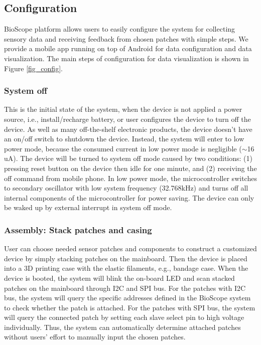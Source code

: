 \subsection{Configuration}
BioScope platform allows users to easily configure the system for collecting sensory data and receiving feedback from chosen patches with simple steps. We provide a mobile app running on top of Android for data configuration and data visualization. 
The main steps of configuration for data visualization is shown in Figure \ref{fig_config}. 

\subsubsection{System off} 
This is the initial state of the system, when the device is not applied a power source, i.e., install/recharge battery, or user configures the device to turn off the device.
As well as many off-the-shelf electronic products, the device doesn't have an on/off switch to shutdown the device. 
Instead, the system will enter to low power mode, because the consumed current in low power mode is negligible ($\sim$16 uA). 
The device will be turned to system off mode caused by two conditions: (1) pressing reset button on the device then idle for one minute, and (2) receiving the off command from mobile phone.
In low power mode, the microcontroller switches to secondary oscillator with low system frequency (32.768kHz) and turns off all internal components of the microcontroller for power saving. The device can only be waked up by external interrupt in system off mode.

\subsubsection{Assembly: Stack patches and casing} 
User can choose needed sensor patches and components to construct a customized device by simply stacking patches on the mainboard. Then the device is placed into a 3D printing case with the elastic filaments, e.g., bandage case.
When the device is booted, the system will blink the on-board LED and scan stacked patches on the mainboard through I2C and SPI bus. For the patches with I2C bus, the system will query the specific addresses defined in the BioScope system to check whether the patch is attached. For the patches with SPI bus, the system will query the connected patch by setting each slave select pin to high voltage individually. Thus, the system can automatically determine attached patches without users' effort to manually input the chosen patches.

